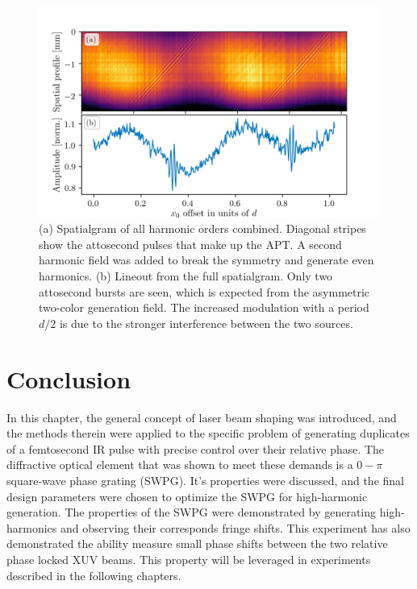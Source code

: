 \begin{figure}
	\centering
	\includegraphics[width=1.0\textwidth]{figures/Two_source/full_spatialgram_w2w.png}
	\caption{(a) Spatialgram of all harmonic orders combined. Diagonal stripes show the attosecond pulses that make up the APT. A second harmonic field was added to break the symmetry and generate even harmonics. (b) Lineout from the full spatialgram.  Only two attosecond bursts are seen, which is expected from the asymmetric two-color generation field.  The increased modulation with a period $d/2$ is due to the stronger interference between the two sources.}
	\label{fig:full_spatialgram_w2w}
\end{figure}

\section{Conclusion}
In this chapter, the general concept of laser beam shaping was introduced, and the methods therein were applied to the specific problem of generating duplicates of a femtosecond IR pulse with precise control over their relative phase. The diffractive optical element that was shown to meet these demands is a $0-\pi$ square-wave phase grating (SWPG).  It's properties were discussed, and the final design parameters were chosen to optimize the SWPG for high-harmonic generation.  The properties of the SWPG were demonstrated by  generating high-harmonics and observing their corresponds fringe shifts.  This experiment has also demonstrated the ability measure small phase shifts between the two relative phase locked XUV beams.  This property will be leveraged in experiments described in the following chapters.
